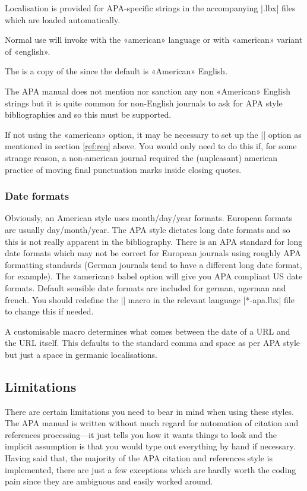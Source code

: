 \documentclass{ltxdockit}
\begin{document}
Localisation is provided for APA-specific strings in the accompanying
|.lbx| files which are loaded automatically.

Normal use will invoke  with the «american» language or
 with «american» variant of «english».

The  is a copy of the  since
the default is «American» English.

The APA manual does not mention nor sanction any non «American» English
strings but it is quite common for non-English journals to ask for APA style
bibliographies and so this must be supported.

If not using the  «american» option, it may be necessary to set up
the |\DeclareQuotePunctuation| option as mentioned in section \ref{ref:req}
above. You would only need to do this if, for some strange reason, a
non-american journal required the (unpleasant) american practice of moving
final punctuation marks inside closing quotes.

\subsubsection{Date formats}

Obviously, an American style uses month/day/year formats. European formats
are usually day/month/year. The APA style dictates long date formats and so
this is not really apparent in the bibliography. There is an APA standard
for long date formats which may not be correct for European journals using
roughly APA formatting standards (German journals tend to have a different
long date format, for example). The «american» babel option will give you
APA compliant US date formats. Default sensible date formats are included
for german, ngerman and french. You should redefine the |\mkbibdatelong|
macro in the relevant language |*-apa.lbx| file to change this if needed.

A customisable macro  determines what comes between the
date of a URL and the URL itself. This defaults to the standard comma and
space as per APA style but just a space in germanic localisations.

\subsection{Limitations}
\label{use:limit}
There are certain limitations you need to bear in mind when using these
styles. The APA manual is written without much regard for automation of
citation and references processing---it just tells you how it wants things to
look and the implicit assumption is that you would type out everything by
hand if necessary. Having said that, the majority of the APA citation
and references style is implemented, there are just a few exceptions which
are hardly worth the coding pain since they are ambiguous and easily worked
around.
\end{document}
